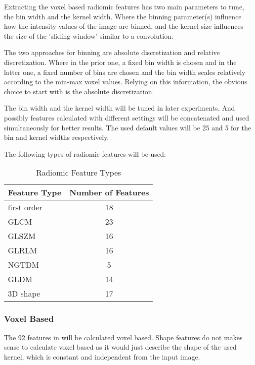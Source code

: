 Extracting the voxel based radiomic features has two main parameters to tune, the bin width and the kernel width. Where the binning parameter(s) influence how the intensity values of the image are binned, and the kernel size influences the size of the 'sliding window' similar to a convolution.\par
The two approaches for binning are absolute discretization and relative discretization. Where in the prior one, a fixed bin width is chosen and in the latter one, a fixed number of bins are chosen and the bin width scales relatively according to the min-max voxel values.  Relying on this information, the obvious choice to start with is the absolute discretization.\par
The bin width and the kernel width will be tuned in later experiments. And possibly features calculated with different settings will be concatenated and used simultaneously for better results. The used default values will be 25 and 5 for the bin and kernel widths respectively.\par
The following types of radiomic features will be used:
\begin{table}[H]
\centering
\begin{tabular}{|l|c|}
\hline
\textbf{Feature Type} & \textbf{Number of Features} \\ \hline
first order & 18 \\ \hline
\ac{GLCM} & 23 \\ \hline
\ac{GLSZM} & 16 \\ \hline
\ac{GLRLM} & 16 \\ \hline
\ac{NGTDM} & 5 \\ \hline
\ac{GLDM} & 14 \\ \hline
3D shape & 17 \\ \hline
\end{tabular}
\caption{Radiomic Feature Types}
\label{tab:radf0}
\end{table}

\subsubsection{Voxel Based}
The 92 features in  will be calculated voxel based. Shape features do not makes sense to calculate voxel based as it would just describe the shape of the used kernel, which is constant and independent from the input image.

